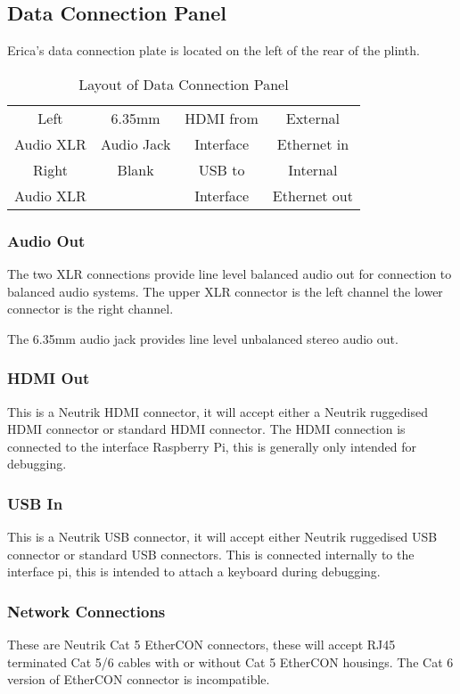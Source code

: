 \subsection{Data Connection Panel}
Erica's data connection plate is located on the left of the rear of the plinth.

\begin{table}[h]
\centering
\begin{tabular}[h]{|c|c|c|c|}
\hline
Left & 6.35mm & HDMI from & External \\
Audio XLR & Audio Jack & Interface & Ethernet in \\
\hline
Right & Blank & USB to & Internal \\
Audio XLR & & Interface & Ethernet out \\
\hline
\end{tabular}
\caption{Layout of Data Connection Panel} 
\end{table}


\subsubsection{Audio Out}
The two XLR connections provide line level balanced audio out for connection to balanced audio systems.  The upper XLR connector is the left channel the lower connector is the right channel.

The 6.35mm audio jack provides line level unbalanced stereo audio out.

\subsubsection{HDMI Out}
This is a Neutrik HDMI connector, it will accept either a Neutrik ruggedised HDMI connector or standard HDMI connector.  The HDMI connection is connected to the interface Raspberry Pi, this is generally only intended for debugging.

\subsubsection{USB In}
This is a Neutrik USB connector, it will accept either Neutrik ruggedised USB connector or standard USB connectors.  This is connected internally to the interface pi, this is intended to attach a keyboard during debugging.

\subsubsection{Network Connections}
These are Neutrik Cat 5 EtherCON connectors, these will accept RJ45 terminated Cat 5/6 cables with or without Cat 5 EtherCON housings. 
The Cat 6 version of EtherCON connector is incompatible.

